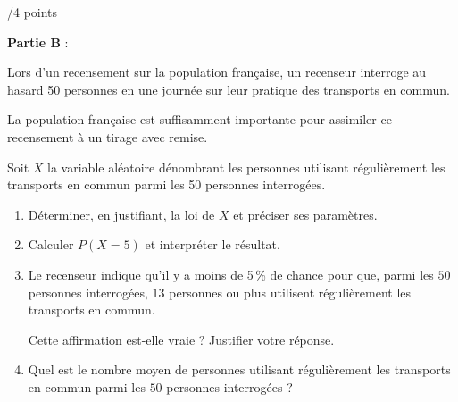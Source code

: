 \documentclass[a4paper]{article}
\begin{document}
\begin{exerciceinterro}{\hspace{2cm}/4 points}{}
\bigskip

\textbf{Partie B} :

\medskip

Lors d'un recensement sur la population française, un recenseur interroge au hasard 50 personnes en une journée sur leur pratique des transports en commun. 

La population française est suffisamment importante pour assimiler ce recensement à un tirage avec remise.

Soit $X$ la variable aléatoire dénombrant les personnes utilisant régulièrement les transports en commun parmi les 50 personnes interrogées.

\medskip

\begin{enumerate}
\item Déterminer, en justifiant, la loi de $X$ et préciser ses paramètres.
\item Calculer $P(X = 5)$ et interpréter le résultat.
\item Le recenseur indique qu'il y a moins de 5\,\% de chance pour que, parmi les $50$ personnes interrogées, $13$ personnes ou plus utilisent régulièrement les transports en commun.

Cette affirmation est-elle vraie ? Justifier votre réponse.
\item Quel est le nombre moyen de personnes utilisant régulièrement les transports en commun parmi les $50$ personnes interrogées ?
\end{enumerate}


\end{exerciceinterro}
\end{document}
